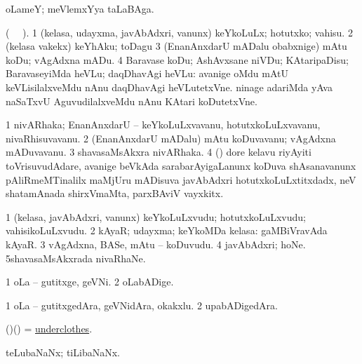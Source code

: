 \bentry
{} 
\gl{\nA}
\expl{}
\bmng
 oLameY; meVlemxYya taLaBAga. 
\emng
\eentry

\bentry
{} 
\gl{\sakirx}
\expl{}
\bmng
 (\BU\  \BUkaq\ ). 
\bnum
\num{1} (kelasa, udayxma, javAbAdxri, \mo vanunx) keYkoLuLx; hotutxko; vahisu. 
\num{2} (kelasa \mo vakekx) keYhAku; toDagu 
\num{3} (EnanAnxdarU mADalu obabxnige) mAtu koDu; vAgAdxna mADu. 
\num{4} Baravase koDu; AshAvxsane niVDu; KAtaripaDisu; BaravaseyiMda heVLu; daqDhavAgi heVLu:  avanige oMdu mAtU keVLisilalxveMdu nAnu daqDhavAgi heVLutetxVne.  ninage adariMda yAva naSaTxvU AguvudilalxveMdu nAnu KAtari koDutetxVne. 
\enum
\emng
\eentry

\bentry
{} 
\gl{\nA}
\expl{}
\bmng
\bnum
\num{1} nivARhaka; EnanAnxdarU -- keYkoLuLxvavanu, hotutxkoLuLxvavanu, nivaRhisuvavanu. 
\num{2} (EnanAnxdarU mADalu) mAtu koDuvavanu; vAgAdxna mADuvavanu. 
\num{3} shavasaMsAkxra nivARhaka. 
\num{4} (\ca) dore kelavu riyAyiti toVrisuvudAdare, avanige beVkAda sarabarAyigaLanunx koDuva shAsanavanunx pAliRmeMTinalilx maMjUru mADisuva javAbAdxri hotutxkoLuLxtitxdadx, neV shatamAnada shirxVmaMta, parxBAviV vayxkitx. 
\enum
\emng
\eentry

\bentry
{} 
\gl{\nA}
\expl{}
\bmng
\bnum
\num{1} (kelasa, javAbAdxri, \mo vanunx) keYkoLuLxvudu; hotutxkoLuLxvudu; vahisikoLuLxvudu. 
\num{2} kAyaR; udayxma; keYkoMDa kelasa:  gaMBiVravAda kAyaR. 
\num{3} vAgAdxna, BASe, mAtu -- koDuvudu. 
\num{4} javAbAdxri; hoNe. 
\num{5}shavasaMsAkxrada nivaRhaNe. 
\enum
\emng
\eentry

\bentry
{} 
\gl{\nA}
\bmng
\bnum
\num{1} oLa -- gutitxge, geVNi. 
\num{2} oLabADige. 
\enum
\emng
\eentry

\bentry
{} 
\gl{\nA}
\expl{}
\bmng
\bnum
\num{1} oLa -- gutitxgedAra, geVNidAra, okakxlu. 
\num{2} upabADigedAra. 
\enum
\emng
\eentry

\bentry
{} 
\gl{\nA}
\expl{}
\bmng
 (\bava)(\AmA) = \hyperlink{underclothes}{underclothes}. 
\emng
\eentry

\bentry
{} 
\gl{\nA}
\expl{}
\bmng
 teLubaNaNx; tiLibaNaNx. 
\emng
\eentry

